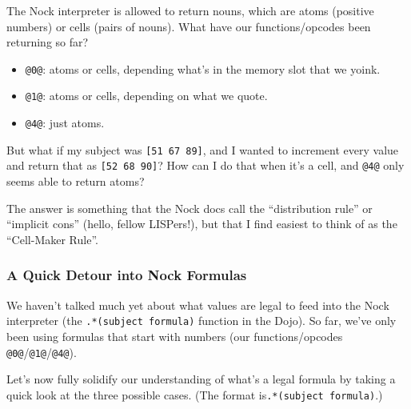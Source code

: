 \documentclass[twoside]{article}
\begin{document}
The Nock interpreter is allowed to return nouns, which are atoms (positive numbers) or cells (pairs of nouns). What have our functions/opcodes been returning so far?

\begin{itemize}
  \item  \lstinline[style=inlinecode]{@0@}: atoms or cells, depending what's in the memory slot that we yoink.
  \item  \lstinline[style=inlinecode]{@1@}: atoms or cells, depending on what we quote.
  \item  \lstinline[style=inlinecode]{@4@}: just atoms.
\end{itemize}

But what if my subject was \lstinline[style=inlinecode]{[51 67 89]}, and I wanted to increment every value and return that as \lstinline[style=inlinecode]{[52 68 90]}? How can I do that when it's a cell, and \lstinline[style=inlinecode]{@4@} only seems able to return atoms?

The answer is something that the Nock docs call the “distribution rule” or “implicit cons” (hello, fellow LISPers!), but that I find easiest to think of as the “Cell-Maker Rule”.

\subsubsection{A Quick Detour into Nock Formulas}

We haven't talked much yet about what values are legal to feed into the Nock interpreter (the \lstinline[style=inlinecode]{.*(subject formula)} function in the Dojo). So far, we've only been using formulas that start with numbers (our functions/opcodes \lstinline[style=inlinecode]{@0@}/\lstinline[style=inlinecode]{@1@}/\lstinline[style=inlinecode]{@4@}).

Let's now fully solidify our understanding of what's a legal formula by taking a quick look at the three possible cases. (The format is\lstinline[style=inlinecode]{.*(subject formula)}.)
\end{document}
